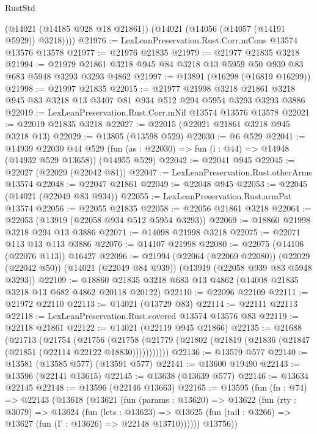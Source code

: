 \begin{lexlean}{RustStd}
\begin{coremodule}
        (@14021 (@14185 @928 @18 @21861))
        (@14021 (@14056 (@14057 (@14191 @5929)) @3218))))
@21976 := LexLeanPreservation.Rust.Corr.mCons @13574 @13576 @13578
@21977 := @21976 @21835
@21979 := @21977 @21835 @3218
@21994 := @21979 @21861 @3218 @945 @84 @3218 @13 @5959 @50 @939 @83 @683 @5948 @3293 @3293 @4862
@21997 := @13891 (@16298 (@16819 @16299))
@21998 := @21997 @21835
@22015 := @21977
    @21998
    @3218
    @21861
    @3218
    @945
    @83
    @3218
    @13
    @3407
    @81
    @934
    @512
    @294
    @5954
    @3293
    @3293
    @3886
@22019 := LexLeanPreservation.Rust.Corr.mNil @13574 @13576 @13578
@22021 := @22019 @21835 @3218
@22027 := @22015 (@22021 @21861 @3218 @945 @3218 @13)
@22029 := @13805 (@13598 @529)
@22030 := @6 @529
@22041 := @14939
    @22030
    @44
    @529
    (fun (as : @22030) => fun (i : @44) => @14948 (@14932 @529 @13658))
    (@14955 @529)
@22042 := @22041 @945
@22045 := @22027 (@22029 (@22042 @81))
@22047 := LexLeanPreservation.Rust.otherArms @13574
@22048 := @22047 @21861
@22049 := @22048 @945
@22053 := @22045 (@14021 (@22049 @83 @934))
@22055 := LexLeanPreservation.Rust.armPat @13574
@22056 := @22055 @21835
@22058 := @22056 @21861 @3218
@22064 := @22053 (@13919 (@22058 @934 @512 @5954 @3293))
@22069 := @18860 @21998 @3218 @294 @13 @3886
@22071 := @14098 @21998 @3218
@22075 := @22071 @113 @13 @113 @3886
@22076 := @14107 @21998
@22080 := @22075 (@14106 (@22076 @113)) @16427
@22096 := @21994
    (@22064 (@22069 @22080))
    (@22029 (@22042 @50))
    (@14021 (@22049 @84 @939))
    (@13919 (@22058 @939 @83 @5948 @3293))
@22109 := @18860 @21835 @3218 @683 @13 @4862 (@14008 @21835 @3218 @13 @682 @4862 @20118 @20122)
@22110 := @22096 @22109
@22111 := @21972 @22110
@22113 := @14021 (@13729 @83)
@22114 := @22111 @22113
@22118 := LexLeanPreservation.Rust.covered @13574 @13576 @83
@22119 := @22118 @21861
@22122 := @14021 (@22119 @945 @21866)
@22135 := @21688
    (@21713
      (@21754
        (@21756
          (@21758 (@21779 (@21802 (@21819 (@21836 (@21847 (@21851 (@22114 @22122 @18830)))))))))))
@22136 := @13579 @577
@22140 := @13581 (@13585 @577) (@13591 @577)
@22141 := @13600 @19490
@22143 := @13596 (@22141 @13615)
@22145 := @13638 (@13639 @577)
@22146 := @13634 @22145
@22148 := @13596 (@22146 @13663)
@22165 := @13595
    (fun (fn : @74) =>
    @22143
      (@13618
        (@13621
          (fun (params : @13620) =>
          @13622
            (fun (rty : @3079) =>
            @13624
              (fun (lets : @13623) =>
              @13625 (fun (tail : @3266) => @13627 (fun (Γ : @13626) => @22148 @13710))))))
        @13756))

\end{coremodule}
\end{lexlean}

